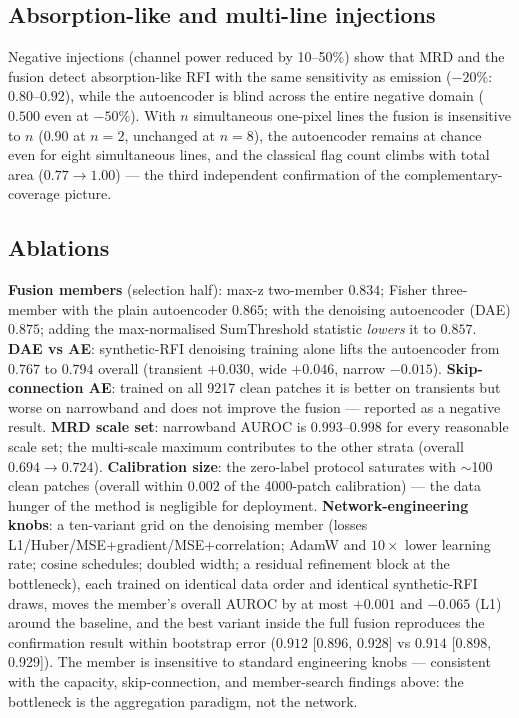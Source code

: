 \documentclass[journal]{IEEEtran}
\begin{document}
\subsection{Absorption-like and multi-line injections}
Negative injections (channel power reduced by 10--50\%) show that MRD and
the fusion detect absorption-like RFI with the same sensitivity as emission
($-20\%$: $0.80$--$0.92$), while the autoencoder is blind across the entire
negative domain ($0.500$ even at $-50\%$).  With $n$ simultaneous one-pixel
lines the fusion is insensitive to $n$ ($0.90$ at $n=2$, unchanged at
$n=8$), the autoencoder remains at chance even for eight simultaneous lines,
and the classical flag count climbs with total area ($0.77\to1.00$) --- the
third independent confirmation of the complementary-coverage picture.

\subsection{Ablations}
\label{sec:ablation}
\textbf{Fusion members} (selection half): max-z two-member $0.834$;
Fisher three-member with the plain autoencoder $0.865$; with the denoising
autoencoder (DAE) $0.875$; adding the max-normalised SumThreshold statistic
\emph{lowers} it to $0.857$.  \textbf{DAE vs AE}: synthetic-RFI denoising
training alone lifts the autoencoder from $0.767$ to $0.794$ overall
(transient $+0.030$, wide $+0.046$, narrow $-0.015$).  \textbf{Skip-connection
AE}: trained on all 9217 clean patches it is better on transients but worse
on narrowband and does not improve the fusion --- reported as a negative
result.  \textbf{MRD scale set}: narrowband AUROC is $0.993$--$0.998$ for
every reasonable scale set; the multi-scale maximum contributes to the other
strata (overall $0.694\to0.724$).  \textbf{Calibration size}: the zero-label
protocol saturates with $\sim$100 clean patches (overall within $0.002$ of
the 4000-patch calibration) --- the data hunger of the method is negligible
for deployment.  \textbf{Network-engineering knobs}: a ten-variant grid on
the denoising member (losses L1/Huber/MSE+gradient/MSE+correlation;
AdamW and $10\times$ lower learning rate; cosine schedules; doubled width;
a residual refinement block at the bottleneck), each trained on identical
data order and identical synthetic-RFI draws, moves the member's overall
AUROC by at most $+0.001$ and $-0.065$ (L1) around the baseline, and the
best variant inside the full fusion reproduces the confirmation result
within bootstrap error ($0.912$ [0.896, 0.928] vs $0.914$ [0.898, 0.929]).
The member is insensitive to standard engineering knobs --- consistent with
the capacity, skip-connection, and member-search findings above: the
bottleneck is the aggregation paradigm, not the network.
\end{document}
